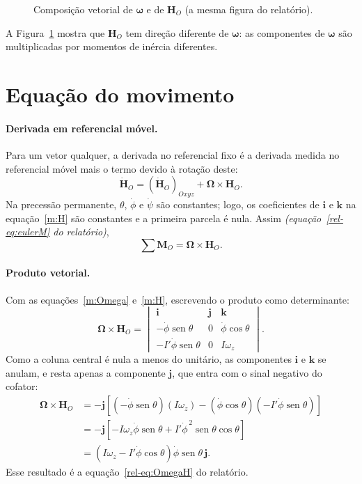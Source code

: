 \documentclass[11pt,a4paper]{article}
\newcommand{\vet}[1]{\mathbf{#1}}
\newcommand{\vomega}{\boldsymbol{\omega}}
\newcommand{\vOmega}{\boldsymbol{\Omega}}
\newcommand{\seno}{\operatorname{sen}}
\newcommand{\phid}{\dot{\phi}}
\newcommand{\psid}{\dot{\psi}}
\newcommand{\rel}[1]{\textit{(equação~\ref*{rel-eq:#1} do relatório)}}
\begin{document}
\begin{figure}[H]
\centering

\caption{Composição vetorial de $\boldsymbol{\omega}$ e de $\mathbf{H}_O$ (a mesma figura do relatório).}
\label{m:fig:vet}
\end{figure}

A Figura~\ref{m:fig:vet} mostra que $\vet{H}_O$ tem direção diferente de $\vomega$: as componentes de $\vomega$ são multiplicadas por momentos de inércia diferentes.

\section{Equação do movimento}

\paragraph{Derivada em referencial móvel.} Para um vetor qualquer, a derivada no referencial fixo é a derivada medida no referencial móvel mais o termo devido à rotação deste:
\begin{equation}
\dot{\vet{H}}_O=\left(\dot{\vet{H}}_O\right)_{Oxyz}+\vOmega\times\vet{H}_O.
\end{equation}
Na precessão permanente, $\theta$, $\phid$ e $\psid$ são constantes; logo, os coeficientes de $\vet{i}$ e $\vet{k}$ na equação~\ref{m:H} são constantes e a primeira parcela é nula. Assim \rel{eulerM},
\begin{equation}
\sum\vet{M}_O=\vOmega\times\vet{H}_O.\label{m:euler}
\end{equation}

\paragraph{Produto vetorial.} Com as equações~\ref{m:Omega} e~\ref{m:H}, escrevendo o produto como determinante:
\begin{equation}
\vOmega\times\vet{H}_O=
\begin{vmatrix}
\vet{i}&\vet{j}&\vet{k}\\
-\phid\seno\theta&0&\phid\cos\theta\\
-I'\phid\seno\theta&0&I\omega_z
\end{vmatrix}.
\end{equation}
Como a coluna central é nula a menos do unitário, as componentes $\vet{i}$ e $\vet{k}$ se anulam, e resta apenas a componente $\vet{j}$, que entra com o sinal negativo do cofator:
\begin{align}
\vOmega\times\vet{H}_O
&=-\vet{j}\left[\left(-\phid\seno\theta\right)\left(I\omega_z\right)-\left(\phid\cos\theta\right)\left(-I'\phid\seno\theta\right)\right]\nonumber\\
&=-\vet{j}\left[-I\omega_z\phid\seno\theta+I'\phid^{\,2}\seno\theta\cos\theta\right]\nonumber\\
&=\left(I\omega_z-I'\phid\cos\theta\right)\phid\seno\theta\,\vet{j}.\label{m:OxH}
\end{align}
Esse resultado é a equação~\ref*{rel-eq:OmegaH} do relatório.
\end{document}
